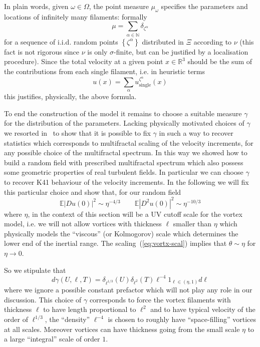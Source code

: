 \documentclass[11pt]{preprint}
\begin{document}
In plain words, given $\omega\in\Omega$, the point measure $\mu_{\omega}$
specifies the parameters and locations of infinitely many filaments: formally
\begin{equation}
\mu=\sum_{\alpha\in\mathbb{N}}\delta_{\zeta^{\alpha}}\label{muformal}%
\end{equation}
for a sequence of i.i.d. random points $\left\{  \zeta^{\alpha}\right\}  $
distributed in $\Xi$ according to $\nu$ (this fact is not rigorous since $\nu$
is only $\sigma$-finite, but can be justified by a localisation procedure).
Since the total velocity at a given point $x\in\mathbb{R}^{3}$ should be the
sum of the contributions from each single filament, i.e. in heuristic terms
\begin{equation}
u(x)=\sum_{\alpha}u_{\text{single}}^{\zeta^{\alpha}}\left(  x\right)
\label{uformal}%
\end{equation}
this justifies, physically, the above formula.

To end the construction of the model it remains to choose a suitable measure
$\gamma$ for the distribution of the parameters. Lacking physically motivated
choices of $\gamma$ we resorted in~\cite{FlaGub} to show that it is possible
to fix $\gamma$ in such a way to recover statistics which corresponds to
multifractal scaling of the velocity increments, for any possible choice of
the multifractal spectrum. In this way we showed how to build a random field
with prescribed multifractal spectrum which also possess some geometric
properties of real turbulent fields. In particular we can choose $\gamma$ to
recover K41 behaviour of the velocity increments. In the following we will fix
this particular choice and show that, for our random field
\begin{equation}\label{eq:vortx-scal}
\mathbb{E} |Du(0)|^{2} \sim\eta^{-4/3} \qquad\mathbb{E} |D^{2} u(0)|^{2}
\sim\eta^{-10/3}%
\end{equation}
where $\eta$, in the context of this section will be a UV cutoff scale for the
vortex model, i.e. we will not allow vortices with thickness $\ell$ smaller
than $\eta$ which physically models the ``viscous'' (or Kolmogorov) scale
which determines the lower end of the inertial range. The
scaling~(\ref{eq:vortx-scal}) implies that $\theta\sim\eta$ for $\eta\to0$.

So we stipulate that
\begin{equation}
d\gamma(U,\ell,T)= \delta_{\ell^{1/3}}(U)\delta_{\ell^{2}}(T)\ell^{-4}
1_{\ell \in (\eta,1)} d\ell
\end{equation}
where we ignore a possible constant prefactor which will not play any role in
our discussion. This choice of $\gamma$ corresponds to force the vortex
filaments with thickness $\ell$ to have length proportional to $\ell^{2}$ and
to have typical velocity of the order of $\ell^{1/3}$, the ``density''
$\ell^{-4}$ is chosen to roughly have ``space-filling'' vortices at all scales.
Moreover vortices can have thickness going from the small scale $\eta$ to a large ``integral'' scale of order $1$.
\end{document}
